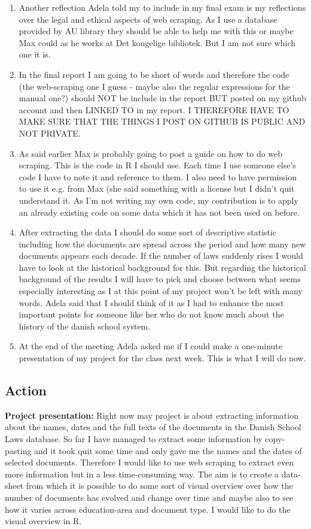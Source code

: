 \documentclass{article}
\begin{document}
\begin{enumerate}
\begin{enumerate}
    \end{enumerate}
        \item Another reflection Adela told my to include in my final exam is my reflections over the legal and ethical aspects of web scraping. As I use a database provided by AU library they should be able to help me with this or maybe Max could as he works at Det kongelige bibliotek. But I am not sure which one it is.
        \item In the final report I am going to be short of words and therefore the code (the web-scraping one I guess - maybe also the regular expressions for the manual one?) should NOT be include in the report BUT posted on my github account and then LINKED TO in my report. I THEREFORE HAVE TO MAKE SURE THAT THE THINGS I POST ON GITHUB IS PUBLIC AND NOT PRIVATE.
        \item As said earlier Max is probably going to post a guide on how to do web scraping. This is the code in R I should use. Each time I use someone else's code I have to note it and reference to them. I also need to have permission to use it e.g. from Max (she said something with a license but I didn't quit understand it. As I'm not writing my own code, my contribution is to apply an already existing code on some data which it has not been used on before.
        \item After extracting the data I should do some sort of descriptive statistic including how the documents are spread across the period and how many new documents appears each decade. If the number of laws suddenly rises I would have to look at the historical background for this. But regarding the historical background of the results I will have to pick and choose between what seems especially interesting as I at this point of my project won't be left with many words. Adela said that I should think of it as I had to enhance the most important points for someone like her who do not know much about the history of the danish school system.
        \item At the end of the meeting Adela asked me if I could make a one-minute presentation of my project for the class next week. This is what I will do now.
\end{enumerate}

\subsection{Action}
\textbf{Project presentation:} Right now may project is about extracting information about the names, dates and the full texts of the documents in the Danish School Laws database. So far I have managed to extract some information by copy-pasting and it took quit some time and only gave me the names and the dates of selected documents. Therefore I would like to use web scraping to extract even more information but in a less time-consuming way. The aim is to create a data-sheet from which it is possible to do some sort of visual overview over how the number of documents has evolved and change over time and maybe also to see how it varies across education-area and document type. I would like to do the visual overview in R.
\end{document}
